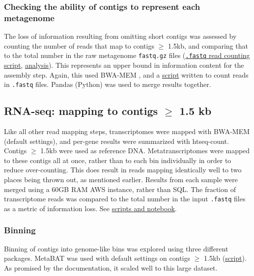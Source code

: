 \subsubsection{Checking the ability of contigs to represent each metagenome}
The loss of information resulting from omitting short contigs was assessed by counting the number of reads that map to contigs $\geq$ 1.5kb, and comparing that to the total number in the raw metagenome \texttt{fastq.gz} files (\href{https://github.com/BeckResearchLab/meta4/blob/master/m4b_binning/assembly/data/sample_info/count_reads_in_each_sample.sh}{\texttt{.fastq} read counting script}, \href{https://github.com/BeckResearchLab/meta4/tree/master/m4b_binning/assembly/assess_sample_mappings_to_contigs}{analysis}).
This represents an upper bound in information content for the assembly step.
Again, this used BWA-MEM \cite{li2009}, and a \href{https://github.com/BeckResearchLab/meta4/blob/master/m4b_binning/assembly/data/sample_info/count_reads_in_each_sample.sh}{script} written to count reads in \texttt{.fastq} files.
Pandas (Python) was used to merge results together.

\subsection{RNA-seq: mapping to contigs $\geq$ 1.5 kb}
Like all other read mapping steps, transcriptomes were mapped with BWA-MEM (default settings), and per-gene results were summarized with htseq-count.
Contigs $\geq$ 1.5kb were used as reference DNA.
Metatranscriptomes were mapped to these contigs all at once, rather than to each bin individually in order to reduce over-counting.
This does result in reads mapping identically well to two places being thrown out, as mentioned earlier.
Results from each sample were merged using a 60GB RAM AWS instance, rather than SQL.
The fraction of transcriptome reads was compared to the total number in the input \texttt{.fastq} files as a metric of information loss.
See \href{https://github.com/BeckResearchLab/meta4/tree/master/rnaseq/alignments}{scripts and notebook}.

\subsubsection{Binning}

Binning of contigs into genome-like bins was explored using three different packages.
MetaBAT was used with default settings on contigs $\geq$ 1.5kb (\href{https://github.com/BeckResearchLab/meta4/blob/master/m4b_binning/assembly/2.metabat}{script}).
As promised by the documentation, it scaled well to this large dataset. %

